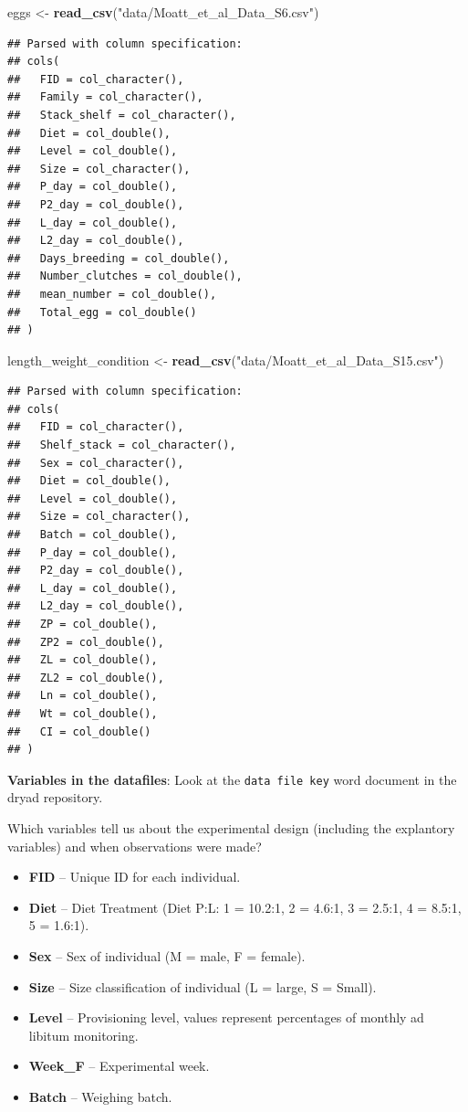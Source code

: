 \documentclass[]{book}
\newenvironment{Shaded}{\begin{snugshade}}{\end{snugshade}}
\newcommand{\KeywordTok}[1]{\textcolor[rgb]{0.13,0.29,0.53}{\textbf{#1}}}
\newcommand{\NormalTok}[1]{#1}
\newcommand{\StringTok}[1]{\textcolor[rgb]{0.31,0.60,0.02}{#1}}
\providecommand{\tightlist}{%
  \setlength{\itemsep}{0pt}\setlength{\parskip}{0pt}}
\begin{document}
\begin{Shaded}
\begin{Highlighting}[]
\NormalTok{eggs <-}\StringTok{ }\KeywordTok{read_csv}\NormalTok{(}\StringTok{"data/Moatt_et_al_Data_S6.csv"}\NormalTok{)}
\end{Highlighting}
\end{Shaded}

\begin{verbatim}
## Parsed with column specification:
## cols(
##   FID = col_character(),
##   Family = col_character(),
##   Stack_shelf = col_character(),
##   Diet = col_double(),
##   Level = col_double(),
##   Size = col_character(),
##   P_day = col_double(),
##   P2_day = col_double(),
##   L_day = col_double(),
##   L2_day = col_double(),
##   Days_breeding = col_double(),
##   Number_clutches = col_double(),
##   mean_number = col_double(),
##   Total_egg = col_double()
## )
\end{verbatim}

\begin{Shaded}
\begin{Highlighting}[]
\NormalTok{length_weight_condition <-}\StringTok{ }\KeywordTok{read_csv}\NormalTok{(}\StringTok{"data/Moatt_et_al_Data_S15.csv"}\NormalTok{)}
\end{Highlighting}
\end{Shaded}

\begin{verbatim}
## Parsed with column specification:
## cols(
##   FID = col_character(),
##   Shelf_stack = col_character(),
##   Sex = col_character(),
##   Diet = col_double(),
##   Level = col_double(),
##   Size = col_character(),
##   Batch = col_double(),
##   P_day = col_double(),
##   P2_day = col_double(),
##   L_day = col_double(),
##   L2_day = col_double(),
##   ZP = col_double(),
##   ZP2 = col_double(),
##   ZL = col_double(),
##   ZL2 = col_double(),
##   Ln = col_double(),
##   Wt = col_double(),
##   CI = col_double()
## )
\end{verbatim}

\textbf{Variables in the datafiles}: Look at the \texttt{data\ file\ key} word document in the dryad repository.

Which variables tell us about the experimental design (including the explantory variables) and when observations were made?

\begin{itemize}
\tightlist
\item
  \textbf{FID} -- Unique ID for each individual.
\item
  \textbf{Diet} -- Diet Treatment (Diet P:L: 1 = 10.2:1, 2 = 4.6:1, 3 = 2.5:1, 4 = 8.5:1, 5 = 1.6:1).
\item
  \textbf{Sex} -- Sex of individual (M = male, F = female).
\item
  \textbf{Size} -- Size classification of individual (L = large, S = Small).
\item
  \textbf{Level} -- Provisioning level, values represent percentages of monthly ad libitum monitoring.
\item
  \textbf{Week\_F} -- Experimental week.
\item
  \textbf{Batch} -- Weighing batch.
\end{itemize}
\end{document}

